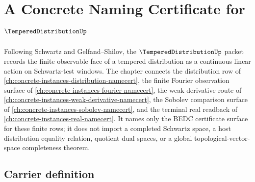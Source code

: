 \chapter{A Concrete Naming Certificate for $\TemperedDistributionUp$}
\label{ch:concrete-instances-tempered-distribution-namecert}

Following Schwartz and Gelfand--Shilov, the $\TemperedDistributionUp$ packet records the finite observable face of a tempered distribution as a continuous linear action on Schwartz-test windows. The chapter connects the distribution row of \autoref{ch:concrete-instances-distribution-namecert}, the finite Fourier observation surface of \autoref{ch:concrete-instances-fourier-namecert}, the weak-derivative route of \autoref{ch:concrete-instances-weak-derivative-namecert}, the Sobolev comparison surface of \autoref{ch:concrete-instances-sobolev-namecert}, and the terminal real readback of \autoref{ch:concrete-instances-real-namecert}. It names only the BEDC certificate surface for these finite rows; it does not import a completed Schwartz space, a host distribution equality relation, quotient dual spaces, or a global topological-vector-space completeness theorem.

\section{Carrier definition}
\label{sec:tempered-distribution-carrier}

